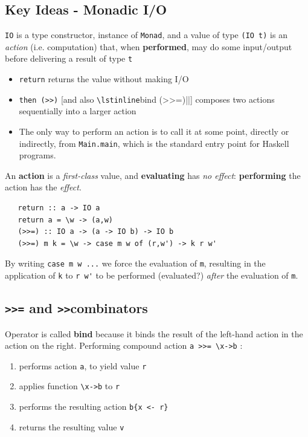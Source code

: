 \subsection{Key Ideas - Monadic I/O}

\lstinline|IO| is a type constructor, instance of \lstinline|Monad|, and a value of type \lstinline|(IO t)| is an
\textit{action} (i.e. computation) that, when \textbf{performed}, may do some
input/output before delivering a result of type \lstinline|t|
\begin{itemize}
   \item 
   \lstinline|return| returns the value without making I/O
   \item
   \lstinline|then (>>)| [and also \lstinline|\lstinline|bind (>>=)||] composes two
   actions sequentially into a larger action
   \item
   The only way to perform an action is to call it at
   some point, directly or indirectly, from
   \lstinline|Main.main|,
   which is the standard entry point for Haskell programs.
\end{itemize}

An \textbf{action} is a \textit{first-class} value,
and \textbf{evaluating} has \textit{no effect}: \textbf{performing} the
action has the \textit{effect}.

\begin{lstlisting}
   return :: a -> IO a
   return a = \w -> (a,w)
   (>>=) :: IO a -> (a -> IO b) -> IO b
   (>>=) m k = \w -> case m w of (r,w') -> k r w'
\end{lstlisting}

By writing \lstinline|case m w ...| we force the evaluation of \lstinline|m|,
resulting in the application of \lstinline|k| to \lstinline|r w'| to be performed (evaluated?) \textit{after} the evaluation of \lstinline|m|.  

\subsection{\texttt{>>=} and \texttt{>>}combinators}
Operator is called \textbf{bind} because it binds the result
of the left-hand action in the action on the right.
Performing compound action \lstinline|a >>= \x->b| :
\begin{enumerate}
   \item performs action \lstinline|a|, to yield value \lstinline|r|
   \item applies function \lstinline|\x->b| to \lstinline|r|
   \item performs the resulting action \lstinline|b{x <- r}|
   \item returns the resulting value \lstinline|v|
\end{enumerate}

